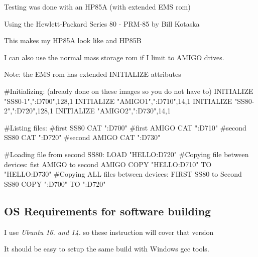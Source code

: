 \begin{DoxyItemize}
\item Testing was done with an H\+P85A (with extended E\+MS rom)
\begin{DoxyItemize}
\item Using the Hewlett-\/\+Packard Series 80 -\/ P\+R\+M-\/85 by Bill Kotaska
\item This makes my H\+P85A look like and H\+P85B
\begin{DoxyItemize}
\item I can also use the normal mass storage rom if I limit to A\+M\+I\+GO drives.
\end{DoxyItemize}
\end{DoxyItemize}
\item Note\+: the E\+MS rom has extended I\+N\+I\+T\+I\+A\+L\+I\+ZE attributes 
\begin{DoxyPre}
  #Initializing: (already done on these images so you do not have to)
  INITIALIZE "SS80-1",":D700",128,1
  INITIALIZE "AMIGO1",":D710",14,1
  INITIALIZE "SS80-2",":D720",128,1
  INITIALIZE "AMIGO2",":D730",14,1\end{DoxyPre}

\end{DoxyItemize}


\begin{DoxyPre}  #Listing files:
  #first SS80
  CAT ":D700"
  #first AMIGO
  CAT ":D710"
  #second SS80
  CAT ":D720"
  #second AMIGO
  CAT ":D730"\end{DoxyPre}



\begin{DoxyPre}  #Loading file from second SS80:
  LOAD "HELLO:D720"
  #Copying file between devices: fist AMIGO to second AMIGO
  COPY "HELLO:D710" TO "HELLO:D730"
  #Copying ALL files between devices: FIRST SS80 to Second SS80
  COPY ":D700" TO ":D720"
\end{DoxyPre}






\subsection*{OS Requirements for software building}


\begin{DoxyItemize}
\item I use {\itshape Ubuntu 16. and 14.} so these instruction will cover that version
\begin{DoxyItemize}
\item It should be easy to setup the same build with Windows gcc tools.
\end{DoxyItemize}
\end{DoxyItemize}

